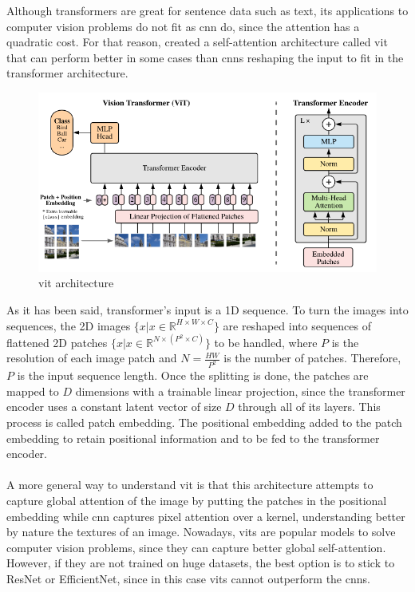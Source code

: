 \documentclass[11pt, a4paper]{article}
\begin{document}
	Although transformers are great for sentence data such as text, its applications to computer vision problems do not fit as \gls{cnn} do, since the attention has a quadratic cost. For that reason, \cite{vit} created a self-attention architecture called \gls{vit} that can perform better in some cases than \gls{cnn}s reshaping the input to fit in the transformer architecture.
	\begin{figure}[H]
		\centering
		\includegraphics[width=12cm]{imgs/relatedwork/vit-architecture}
		\caption{\gls{vit} architecture}
	\end{figure}
	As it has been said, transformer's input is a 1D sequence. To turn the images into sequences, the 2D images $\{x | x \in \mathbb{R} ^{H \times W \times C}\}$ are reshaped into sequences of flattened 2D patches $\{x | x \in \mathbb{R}^{N \times (P^2 \times C)}\}$ to be handled, where $P$ is the resolution of each image patch and $N = \frac{HW}{P^2} $ is the number of patches. Therefore, $P$ is the input sequence length.
	Once the splitting is done, the patches are mapped to $D$ dimensions with a trainable linear projection, since the transformer encoder uses a constant latent vector of size $D$ through all of its layers. This process is called patch embedding. The positional embedding added to the patch embedding to retain positional information and to be fed to the transformer encoder.
	\\\\
	A more general way to understand \gls{vit} is that this architecture attempts to capture global attention of the image by putting the patches in the positional embedding while \gls{cnn} captures pixel attention over a kernel, understanding better by nature the textures of an image. Nowadays, \gls{vit}s are popular models to solve computer vision problems, since they can capture better global self-attention. However, if they are not trained on huge datasets, the best option is to stick to ResNet or EfficientNet, since in this case \gls{vit}s cannot outperform the \gls{cnn}s.
\end{document}
